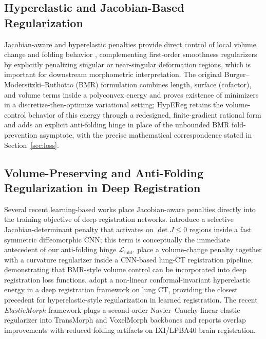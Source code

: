 \documentclass[jimaging,article,submit,pdftex,moreauthors]{Definitions/mdpi}
\begin{document}
\subsection{Hyperelastic and Jacobian-Based Regularization}
Jacobian-aware and hyperelastic penalties provide direct control of local volume change and folding behavior \cite{burger2013hyperelastic}, complementing first-order smoothness regularizers by explicitly penalizing singular or near-singular deformation regions, which is important for downstream morphometric interpretation. The original Burger--Modersitzki--Ruthotto (BMR) formulation combines length, surface (cofactor), and volume terms inside a polyconvex energy and proves existence of minimizers in a discretize-then-optimize variational setting; HypEReg retains the volume-control behavior of this energy through a redesigned, finite-gradient rational form and adds an explicit anti-folding hinge in place of the unbounded BMR fold-prevention asymptote, with the precise mathematical correspondence stated in Section~\ref{sec:loss}.

\subsection{Volume-Preserving and Anti-Folding Regularization in Deep Registration}
Several recent learning-based works place Jacobian-aware penalties directly into the training objective of deep registration networks. \citet{mok2020fast} introduce a selective Jacobian-determinant penalty that activates on $\det J\le 0$ regions inside a fast symmetric diffeomorphic CNN; this term is conceptually the immediate antecedent of our anti-folding hinge $\mathcal{L}_{\mathrm{fold}}$. \citet{hering2021lung} place a volume-change penalty together with a curvature regularizer inside a CNN-based lung-CT registration pipeline, demonstrating that BMR-style volume control can be incorporated into deep registration loss functions. \citet{zou2023conformal} adopt a non-linear conformal-invariant hyperelastic energy in a deep registration framework on lung CT, providing the closest precedent for hyperelastic-style regularization in learned registration. The recent \emph{ElasticMorph} framework \cite{elasticmorph2025} plugs a second-order Navier--Cauchy linear-elastic regularizer into TransMorph and VoxelMorph backbones and reports overlap improvements with reduced folding artifacts on IXI/LPBA40 brain registration.
\end{document}
